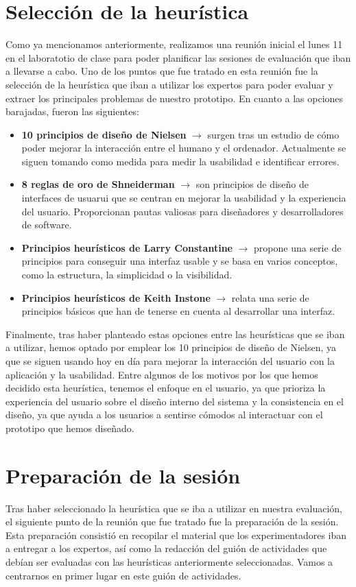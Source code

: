 \section{Selección de la heurística}
Como ya mencionamos anteriormente, realizamos una reunión inicial el lunes 11 en el laboratotio de clase para poder planificar las sesiones de evaluación que iban a llevarse a cabo. Uno de los puntos que fue tratado
en esta reunión fue la selección de la heurística que iban a utilizar los expertos para poder evaluar y extraer los principales problemas de nuestro prototipo. En cuanto a las opciones barajadas, fueron las siguientes:
\begin{itemize}
    \item \textbf{10 principios de diseño de Nielsen} $\rightarrow$ surgen tras un estudio de cómo poder mejorar la interacción entre el humano y el ordenador. Actualmente se
    siguen tomando como medida para medir la usabilidad e identificar errores.
    \item \textbf{8 reglas de oro de Shneiderman} $\rightarrow$ son principios de diseño de interfaces de usuarui que se centran en mejorar la usabilidad y la experiencia
    del usuario. Proporcionan pautas valiosas para diseñadores y desarrolladores de software.
    \item \textbf{Principios heurísticos de Larry Constantine} $\rightarrow$ propone una serie de principios para conseguir una interfaz usable y se basa en varios conceptos, como
    la estructura, la simplicidad o la visibilidad.
    \item \textbf{Principios heurísticos de Keith Instone} $\rightarrow$ relata una serie de principios básicos que han de tenerse en cuenta al desarrollar una interfaz.
\end{itemize}

Finalmente, tras haber planteado estas opciones entre las heurísticas que se iban a utilizar, hemos optado por emplear los 10 principios de diseño de Nielsen, ya que se siguen
usando hoy en día para mejorar la interacción del usuario con la aplicación y la usabilidad. Entre algunos de los motivos por los que hemos decidido esta heurística, tenemos el
enfoque en el usuario, ya que prioriza la experiencia del usuario sobre el diseño interno del sistema y la consistencia en el diseño, ya que ayuda a los usuarios a sentirse cómodos
al interactuar con el prototipo que hemos diseñado.

\section{Preparación de la sesión}
Tras haber seleccionado la heurística que se iba a utilizar en nuestra evaluación, el siguiente punto de la reunión que fue tratado fue la preparación de la sesión. Esta preparación consistió en recopilar
el material que los experimentadores iban a entregar a los expertos, así como la redacción del guión de actividades que debían ser evaluadas con las heurísticas anteriormente seleccionadas. Vamos a centrarnos
en primer lugar en este guión de actividades. \\

